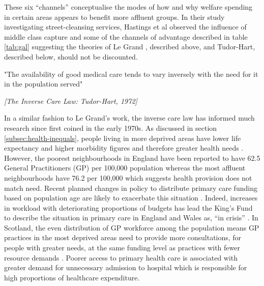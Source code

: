 \documentclass[12pt,]{report}
\begin{document}
\begin{table}[h]
{
}
\end{table}

These six ``channels'' conceptualise the modes of how and why welfare
spending in certain areas appears to benefit more affluent groups. In
their study investigating street-cleansing services, Hastings et al
\citeyearpar{RN116} observed the influence of middle class capture and
some of the channels of advantage described in table \ref{tab:gal}
suggesting the theories of Le Grand \citeyearpar{RN175}, described
above, and Tudor-Hart, described below, should not be discounted.

\epigraph{"The availability of good medical care tends to vary inversely with the need for it in the population served"}{\textit{[The Inverse Care Law: Tudor-Hart, 1972]}}

In a similar fashion to Le Grand's work, the inverse care law has
informed much research since first coined in the early 1970s. As
discussed in section \ref{subsec:health-inequals}, people living in more
deprived areas have lower life expectancy and higher morbidity figures
and therefore greater health needs \citep{RN37}. However, the poorest
neighbourhoods in England have been reported to have 62.5 General
Practitioners (GP) per 100,000 population whereas the most affluent
neighbourhoods have 76.2 per 100,000 \citep{RN317} which suggests health
provision does not match need. Recent planned changes in policy to
distribute primary care funding based on population age are likely to
exacerbate this situation \citep{RN39}. Indeed, increases in workload
with deteriorating proportions of budgets has lead the King's Fund to
describe the situation in primary care in England and Wales as, ``in
crisis'' \citep[pp.3]{RN318}. In Scotland, the even distribution of GP
workforce among the population means GP practices in the most deprived
areas need to provide more consultations, for people with greater needs,
at the same funding level as practices with fewer resource demands
\citep{RN148, RN27}. Poorer access to primary health care is associated
with greater demand for unnecessary admission to hospital
\citep{RN49, RN268} which is responsible for high proportions of
healthcare expenditure.
\end{document}

